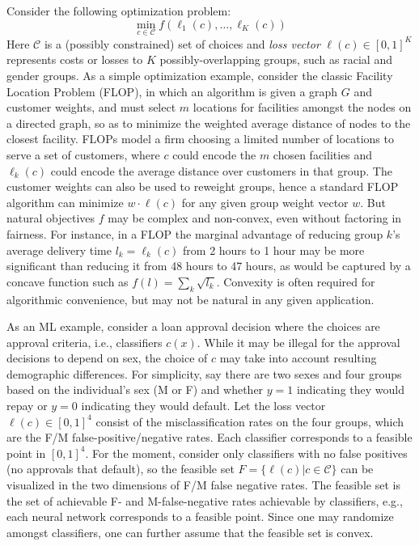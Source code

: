 \documentclass[final, 12pt]{colt2018} %
\def\calC{\mathcal{C}}
\begin{document}
Consider the following optimization problem:
\begin{equation}\label{eq:duh}
\min_{c \in \calC} f(\ell_1(c), \ldots, \ell_K(c))\end{equation}
Here $\calC$ is a (possibly constrained) set of choices and \textit{loss vector} $\ell(c)\in [0,1]^K$ represents costs or losses to $K$ possibly-overlapping groups, such as racial and gender groups. As a simple optimization example, consider the classic Facility Location Problem (FLOP), in which an algorithm is given a graph $G$ and customer weights, and must select $m$ locations for facilities amongst the nodes on a directed graph, so as to minimize the weighted average distance of nodes to the closest facility. FLOPs model a firm choosing a limited number of locations to serve a set of customers, where $c$ could encode the $m$ chosen facilities and $\ell_k(c)$ could encode the average distance over customers in that group. The customer weights can also be used to reweight groups, hence a standard FLOP algorithm can minimize $w \cdot \ell(c)$ for any given group weight vector $w$. But natural objectives $f$ may be complex and non-convex, even without factoring in fairness. For instance, in a FLOP the marginal advantage of reducing group $k$'s average delivery time $l_k=\ell_k(c)$ from 2 hours to 1 hour may be more significant than reducing it from 48 hours to 47 hours, as would be captured by a concave function such as $f(l) = \sum_k \sqrt{l_k}$. Convexity is often required for algorithmic convenience, but may not be natural in any given application. 

As an ML example, consider a loan approval decision where the choices are approval criteria, i.e., classifiers $c(x)$. While it may be illegal for the approval decisions to depend on sex, the choice of $c$ may take into account resulting demographic differences. 
For simplicity, say there are two sexes and four groups based on the individual's sex (M or F) and whether $y=1$ indicating they would repay or $y=0$ indicating they would default. Let the loss vector $\ell(c)\in [0,1]^4$ consist of the misclassification rates on the four groups, which are the F/M false-positive/negative rates. Each classifier corresponds to a feasible point in $[0,1]^4$. For the moment, consider only classifiers with no false positives (no approvals that default), so the feasible set $F=\{ \ell(c)|c \in \calC\}$ can be visualized in the two dimensions of F/M false negative rates. The feasible set is the set of achievable F- and M-false-negative rates achievable by classifiers, e.g., each neural network corresponds to a feasible point. Since one may randomize amongst classifiers, one can further assume that the feasible set is convex.
\end{document}
